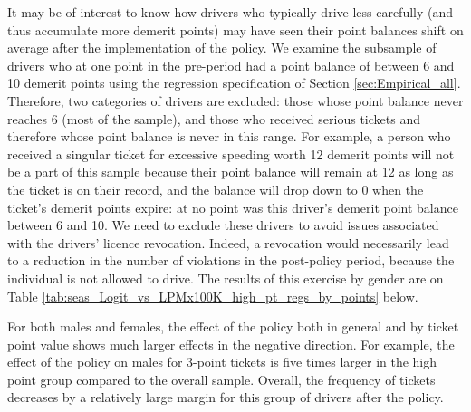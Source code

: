 It may be of interest to know how drivers who typically drive less carefully 
(and thus accumulate more demerit points) 
may have seen their point balances shift on average after the implementation of the policy. 
We examine the subsample of drivers who at one point in the pre-period 
had a point balance of between 6 and 10 demerit points 
using the regression specification of 
Section \ref{sec:Empirical_all}. 
Therefore, two categories of drivers are excluded: 
those whose point balance never reaches 6 (most of the sample), 
and those who received serious tickets and therefore whose point balance is never in this range. 
For example, a person who received a singular ticket for excessive speeding worth 12 demerit points 
will not be a part of this sample because their point balance will remain at 12 
as long as the ticket is on their record, 
and the balance will drop down to 0 when the ticket’s demerit points expire: 
at no point was this driver’s demerit point balance between 6 and 10. 
We need to exclude these drivers to avoid issues associated with the drivers’ licence revocation. 
Indeed, a revocation would necessarily lead to a reduction in the number of violations 
in the post-policy period, because the individual is not allowed to drive. 
The results of this exercise by gender are on 
Table \ref{tab:seas_Logit_vs_LPMx100K_high_pt_regs_by_points} below. %





For both males and females, 
the effect of the policy both in general and by ticket point value 
shows much larger effects in the negative direction. 
For example, the effect of the policy on males for 3-point tickets is five times larger 
in the high point group compared to the overall sample. 
Overall, the frequency of tickets decreases by a relatively large margin 
for this group of drivers after the policy.




